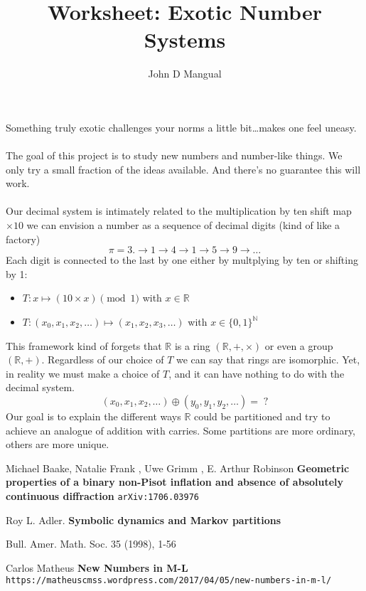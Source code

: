 \documentclass[12pt]{article}
\title{Worksheet: Exotic Number Systems}
\author{John D Mangual}
\date{}
\begin{document}
\selectfont \fontsize{12.5}{15}\selectfont

\maketitle

\noindent Something truly exotic challenges your norms a little bit\dots makes one feel uneasy. \\ \\
The goal of this project is to study new numbers and number-like things.  We only try a small fraction of the ideas available. And there's no guarantee this will work. \\ \\
Our decimal system is intimately related to the multiplication by ten shift map $\times 10$ we can envision a number as a sequence of decimal digits (kind of like a factory)
$$ \pi = 3. \to  1 \to 4 \to 1 \to 5 \to 9 \to \dots $$
Each digit is connected to the last by one either by multplying by ten or shifting by 1:
\begin{itemize}
\item $T: x \mapsto (10 \times x ) \pmod 1 $  with  $x \in \mathbb{R}$\\ 
\item $T: (x_0, x_1, x_2, \dots ) \mapsto (x_1, x_2, x_3, \dots ) $ with $x \in \{0,1\}^\mathbb{N}$
\end{itemize}
This framework kind of forgets that $\mathbb{R}$ is a ring $(\mathbb{R}, + , \times)$ or even a group $(\mathbb{R}, +)$.  Regardless of our choice of $T$ we can say that rings are isomorphic. Yet, in reality we must make a choice of $T$, and it can have nothing to do with the decimal system.
$$ (x_0, x_1, x_2, \dots ) \oplus (y_0, y_1, y_2, \dots ) = \;? $$
Our goal is to explain the different ways $\mathbb{R}$ could be partitioned and try to achieve an analogue of addition with carries.  Some partitions are more ordinary, others are more unique. 

\vfill 

\begin{thebibliography}{}

\item Michael Baake, Natalie Frank , Uwe Grimm , E. Arthur Robinson 
\textbf{Geometric properties of a binary non-Pisot inflation and absence of absolutely continuous diffraction} \texttt{arXiv:1706.03976} 

\item Roy L. Adler.  \textbf{Symbolic dynamics and Markov partitions}

Bull. Amer. Math. Soc. 35 (1998), 1-56 

\item Carlos Matheus \textbf{New Numbers in M-L}\\ \texttt{https://matheuscmss.wordpress.com/2017/04/05/new-numbers-in-m-l/}

\end{thebibliography}
\end{document}
